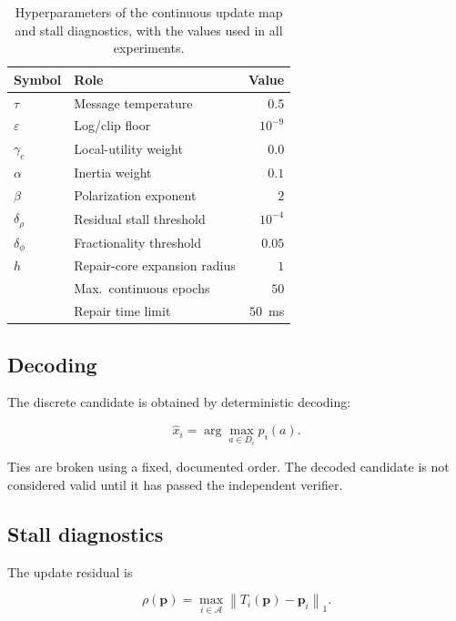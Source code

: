 \documentclass[pdflatex,sn-mathphys-num,iicol,oneside]{sn-jnl}
\begin{document}
\begin{table}[t]
\centering
\caption{Hyperparameters of the continuous update map and stall
diagnostics, with the values used in all experiments.}
\label{tab:hyperparams}
\begin{tabular}{llr}
\toprule
Symbol & Role & Value\\
\midrule
$\tau$ & Message temperature & $0.5$\\
$\varepsilon$ & Log/clip floor & $10^{-9}$\\
$\gamma_c$ & Local-utility weight & $0.0$\\
$\alpha$ & Inertia weight & $0.1$\\
$\beta$ & Polarization exponent & $2$\\
$\delta_{\rho}$ & Residual stall threshold & $10^{-4}$\\
$\delta_{\phi}$ & Fractionality threshold & $0.05$\\
$h$ & Repair-core expansion radius & $1$\\
& Max.\ continuous epochs & $50$\\
& Repair time limit & $50$~ms\\
\bottomrule
\end{tabular}
\end{table}

\subsection{Decoding}

The discrete candidate is obtained by deterministic decoding:

\begin{equation}
\widehat{x}_i
=
\arg\max_{a\in D_i}p_i(a).
\label{eq:decode}
\end{equation}

Ties are broken using a fixed, documented order. The decoded candidate
is not considered valid until it has passed the independent verifier.

\subsection{Stall diagnostics}

The update residual is

\begin{equation}
\rho(\bm{p})
=
\max_{i\in\mathcal{A}}
\left\|
T_i(\bm{p})-\bm{p}_i
\right\|_1.
\label{eq:residual}
\end{equation}
\end{document}
